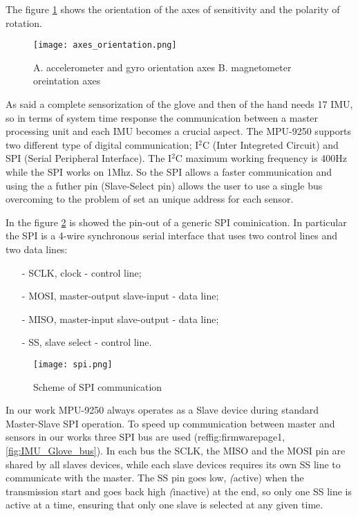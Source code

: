 The figure \ref{fig:axes} shows the orientation of the axes of sensitivity and the polarity of rotation.
\begin{figure}[h]
\centering
\texttt{[image: axes\_orientation.png]}
\caption{A. accelerometer and gyro orientation axes  B. magnetometer oreintation axes}
\label{fig:axes}
\end{figure}

As said a complete sensorization of the glove and then of the hand needs 17 IMU, so in terms of system time response the communication between a master processing unit and each IMU becomes a crucial aspect. The MPU-9250 supports two  different type of digital communication; I$^2$C (Inter Integreted Circuit) and SPI (Serial Peripheral Interface). The I$^2$C maximum working frequency is 400Hz while the SPI works on 1Mhz. So the SPI allows a faster communication and using the a futher pin (Slave-Select pin) allows the user to use a single bus overcoming to the problem of set an unique address for each sensor. 

In the figure \ref{fig:spi} is showed the pin-out of a generic SPI cominication. In particular the SPI is a 4-wire synchronous serial interface that uses two control lines and two data lines:
\begin{itemize}
\item[-] SCLK, clock - control line;
\item[-] MOSI, master-output slave-input - data line;
\item[-] MISO, master-input slave-output - data line;
\item[-] SS,   slave select - control line.
\end{itemize}

\begin{figure}[h]
\centering
\texttt{[image: spi.png]}
\caption{Scheme of SPI communication}
\label{fig:spi}
\end{figure}

In our work MPU-9250 always operates as a Slave device during standard Master-Slave SPI operation. To speed up communication between master and sensors in our works three SPI bus are used (ref{fig:firmwarepage1}, \ref{fig:IMU_Glove_bus}).  In each bus the SCLK, the MISO and the MOSI pin are shared by all slaves devices, while each slave devices requires its own SS line to communicate with the master. The SS pin goes low, \textit(active) when the transmission start and goes back high \textit(inactive) at the end, so only one SS line is active at a time, ensuring that only one slave is selected at any given time.   

